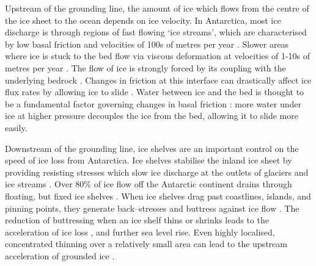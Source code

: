 
Upstream of the grounding line, the amount of ice which flows from the centre of the ice sheet to the ocean depends on ice velocity.  In Antarctica, most ice discharge is through regions of fast flowing `ice streams', which  are characterised by low basal friction and velocities of 100s of metres per year \citep{rignot2011ice}. Slower areas where ice is stuck to the bed flow via viscous deformation at velocities of 1-10s of metres per year \citep{rignot2011ice, morlighem2013inversion}.
The flow of ice is strongly forced by its coupling with the underlying bedrock \citep[e.g.][]{rose1979characteristics,engelhardt1990physical}. Changes in friction at this interface can drastically affect ice flux rates by allowing ice to slide \citep{budd1979empirical}. 
Water between ice and the bed is thought to be a fundamental factor governing changes in basal friction \citep{weertman1957sliding,iken1986combined, alley1989water}:
more water under ice at higher pressure decouples the ice from the bed, allowing it to slide more easily. 

Downstream of the grounding line, ice shelves  are an important control on the speed of ice loss from Antarctica. Ice shelves stabilise the inland ice sheet by  providing resisting stresses which slow ice discharge at the outlets of glaciers and ice streams \citep{dupont2005assessment}. Over 80\% of ice flow off the Antarctic continent drains through floating, but fixed ice shelves \citep{pritchard2012antarctic}. When ice shelves drag past coastlines, islands, and pinning points, they generate back--stresses and buttress against ice flow \citep{dupont2005assessment, furst2016safety}.   The reduction of buttressing when an ice shelf thins or shrinks leads to the acceleration of ice loss \citep{rignot2004accelerated, berthier2012mass}, and further sea level rise. Even highly localised, concentrated thinning over a relatively small area can lead to the upstream acceleration of grounded ice \citep{reese2018far}.

